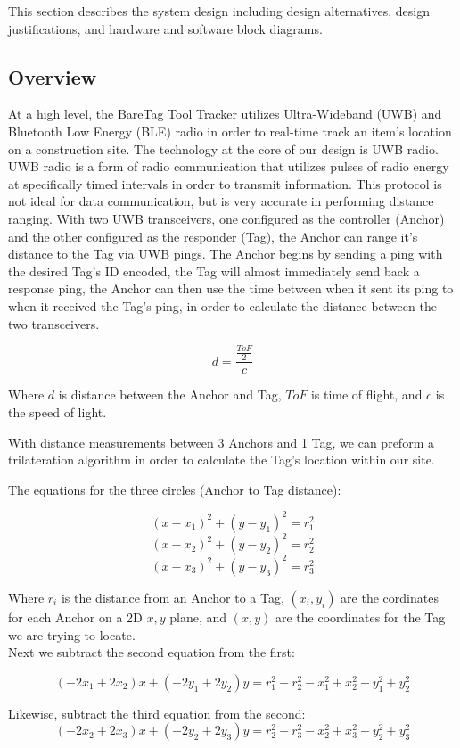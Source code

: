 \documentclass[conference]{IEEEtran}
\begin{document}
This section describes the system design including design alternatives, 
design justifications, and hardware and software block diagrams.

\subsection{Overview}
At a high level, the BareTag Tool Tracker utilizes Ultra-Wideband (UWB) and 
Bluetooth Low Energy (BLE) radio in order to real-time track an 
item's location on a construction site. The technology at the core of our 
design is UWB radio. UWB radio is a form of radio communication that 
utilizes pulses of radio energy at specifically timed intervals in order 
to transmit information. This protocol is not ideal for data communication, 
but is very accurate in performing distance ranging. With two UWB 
transceivers, one configured as the controller (Anchor) and the other 
configured as the responder (Tag), the Anchor can range it's distance
to the Tag via UWB pings. The Anchor begins by sending a ping with 
the desired Tag's ID encoded, the Tag will almost immediately send 
back a response ping, the Anchor can then use the time between when it 
sent its ping to when it received the Tag's ping, in order to 
calculate the distance between the two transceivers. 

\[ d = \frac{\frac{ToF}{2}}{c} \]

Where $d$ is distance between the Anchor and Tag, 
$ToF$ is time of flight, and $c$ is the speed of light.

With distance measurements between 3 Anchors and 1 Tag, we
can preform a trilateration algorithm in order to calculate
the Tag's location within our site.

The equations for the three circles (Anchor to Tag distance):

\[(x - x_1)^2 + (y - y_1)^2 = r_1^2\]
\[(x - x_2)^2 + (y - y_2)^2 = r_2^2\]
\[(x - x_3)^2 + (y - y_3)^2 = r_3^2\]

Where $r_i$ is the distance from an Anchor to a Tag, $(x_i, y_i)$ are 
the cordinates for each Anchor on a 2D $x,y$ plane, and $(x,y)$ are the coordinates
for the Tag we are trying to locate.\\
Next we subtract the second equation from the first:

\[(-2x_1 + 2x_2)x + (-2y_1 + 2y_2)y = r_1^2 - r_2^2 - x_1^2 + x_2^2 - y_1^2 + y_2^2\]

Likewise, subtract the third equation from the second:
\[(-2x_2 + 2x_3)x + (-2y_2 + 2y_3)y = r_2^2 - r_3^2 - x_2^2 + x_3^2 - y_2^2 + y_3^2\]
\end{document}

